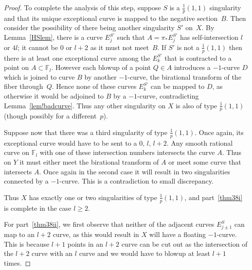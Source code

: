 \documentclass[12pt]{amsbook}
\theoremstyle{plain}
\newcommand{\ldp}{log del Pezzo}
\newcommand{\mb}[1]{\mathbb{#1}}
\newcommand{\F}{\mathbb{F}}
\begin{document}
\begin{proof}
To complete the analysis of this step, suppose $S$ is a $\frac{1}{p}(1,1)$ singularity and that its unique exceptional curve is mapped to the negative section~$B$. Then consider the possibility of there being another singularity $S'$ on~$X$. By Lemma~\ref{HSlem}, there is a curve $E_j^{S'}$ such that $A=\pi_* E_j^{S'}$ has self-intersection $l$ or $4l$; it cannot be $0$ or $l+2$ as it must not meet~$B$. If $S'$ is not a $\frac{1}{p}(1,1)$ then there is at least one exceptional curve among the $E_k^{S'}$ that is contracted to a point on $A\subset\F_l$. However each blowup of a point $Q\in A$ introduces a $-1$-curve $D$ which is joined to curve $B$ by another $-1$-curve, the birational transform of the fiber through~$Q$. Hence none of these curves $E_k^{S'}$ can be mapped to $D$, as otherwise it would be adjoined to $B$ by a $-1$-curve, contradicting Lemma~\ref{lem!badcurve}.
Thus any other singularity on $X$ is also of type $\frac{1}{p}(1,1)$ (though possibly for a different~$p$).

Suppose now that there was a third singularity of type $\frac{1}{p}(1,1)$. Once again, its exceptional curve would have to be sent to a $0, \, l, \, l+2$. Any smooth rational curve on $\F_l$ with one of these intersection numbers intersects the curve $A$. Thus on $Y$ it must either meet the birational transform of $A$ or meet some curve that intersects $A$. Once again in the second case it will result in two singularities connected by a $-1$-curve. This is a contradiction to small discrepancy.

Thus $X$ has exactly one or two singularities of type $\frac{1}p(1,1)$,
and part~\eqref{thm38i} is complete in the case $l\ge2$.






For part~\eqref{thm38ii}, we first observe that neither of the adjacent curves $E_{j\pm1}^S$ can
map to an $l+2$ curve, as this would result in $X$ will have a floating $-1$-curve. This is because $l+1$ points in an $l+2$ curve can be cut out as the intersection of the $l+2$ curve with an $l$ curve and we would have to blowup at least $l+1$ times.


\end{proof}
\end{document}
